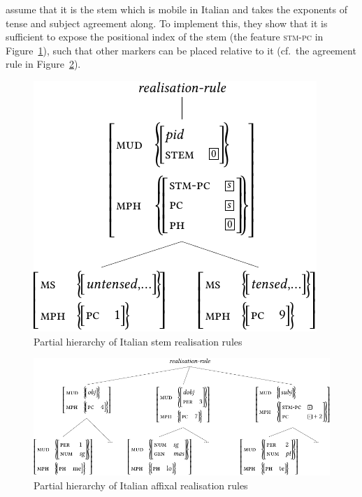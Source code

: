 \documentclass[output=paper
	        ,collection
	        ,collectionchapter
 	        ,biblatex
                ,babelshorthands
                ,newtxmath
                ,draftmode
                ,colorlinks, citecolor=brown
]{./langsci/langscibook}
\begin{document}
{\citet{Crysmann:Bonami:2016} assume that it is the stem which is
mobile in Italian and takes the exponents of tense and subject
agreement along. To implement this, they show that it is sufficient to
expose the positional index of the stem (the feature \textsc{stm-pc}
in Figure~\ref{fig:ItalianStem}), such that other markers can
be placed relative to it (cf.~the agreement rule in Figure~\ref{fig:ItalianAff}).  

\begin{figure}[htb]\centering
  
  \includegraphics[scale=.9]{figures/italian-stem-crop}
  
  \caption{Partial hierarchy of Italian stem realisation rules}
  \label{fig:ItalianStem}
\end{figure}

\begin{figure}[htb]
  \centering
  \includegraphics[scale=.84]{figures/italian-affix-crop}
  
  \caption{Partial hierarchy of Italian affixal realisation rules}
  \label{fig:ItalianAff}
\end{figure}



}
\end{document}
